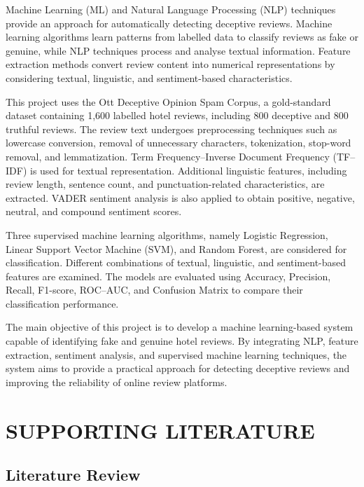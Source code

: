 \documentclass[12pt,a4paper]{report}
\begin{document}
Machine Learning (ML) and Natural Language Processing (NLP)
techniques provide an approach for automatically detecting
deceptive reviews. Machine learning algorithms learn patterns
from labelled data to classify reviews as fake or genuine,
while NLP techniques process and analyse textual information.
Feature extraction methods convert review content into
numerical representations by considering textual, linguistic,
and sentiment-based characteristics.

This project uses the Ott Deceptive Opinion Spam Corpus,
a gold-standard dataset containing 1,600 labelled hotel
reviews, including 800 deceptive and 800 truthful reviews.
The review text undergoes preprocessing techniques such as
lowercase conversion, removal of unnecessary characters,
tokenization, stop-word removal, and lemmatization.
Term Frequency--Inverse Document Frequency (TF--IDF)
is used for textual representation. Additional linguistic
features, including review length, sentence count, and
punctuation-related characteristics, are extracted.
VADER sentiment analysis is also applied to obtain
positive, negative, neutral, and compound sentiment scores.

Three supervised machine learning algorithms, namely
Logistic Regression, Linear Support Vector Machine (SVM),
and Random Forest, are considered for classification.
Different combinations of textual, linguistic, and
sentiment-based features are examined. The models are
evaluated using Accuracy, Precision, Recall, F1-score,
ROC--AUC, and Confusion Matrix to compare their
classification performance.

The main objective of this project is to develop a
machine learning-based system capable of identifying
fake and genuine hotel reviews. By integrating NLP,
feature extraction, sentiment analysis, and supervised
machine learning techniques, the system aims to provide
a practical approach for detecting deceptive reviews
and improving the reliability of online review platforms.

\newpage
\chapter{SUPPORTING LITERATURE}

\section{Literature Review}
\end{document}
